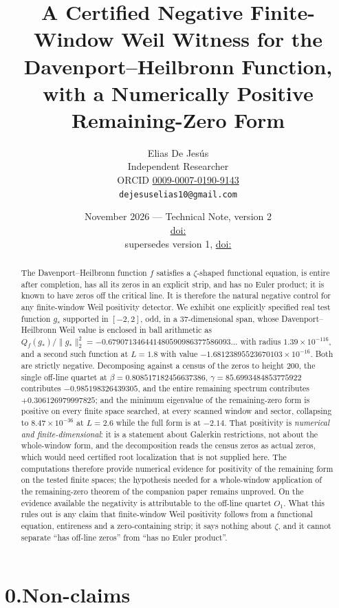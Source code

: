 \documentclass[11pt,a4paper]{article}
\title{\bfseries A Certified Negative Finite-Window Weil Witness for the
Davenport--Heilbronn Function, with a Numerically Positive Remaining-Zero Form}
\author{Elias De Jes\'us\\[2pt]
{\small Independent Researcher}\\[1pt]
{\small ORCID \href{https://orcid.org/0009-0007-0190-9143}{0009-0007-0190-9143}}\\[1pt]
{\small \texttt{dejesuselias10@gmail.com}}}
\date{November 2026 --- Technical Note, version 2\\[2pt]
{\small\href{https://doi.org/\thisdoi}{doi:\thisdoi}}\\[1pt]
{\small supersedes version 1, \href{https://doi.org/\priordoi}{doi:\priordoi}}}
\theoremstyle{definition}
\theoremstyle{remark}
\begin{document}
\maketitle

\begin{abstract}
\noindent
The Davenport--Heilbronn function $f$ satisfies a $\zeta$-shaped functional equation, is
entire after completion, has all its zeros in an explicit strip, and has no Euler
product; it is known to have zeros off the critical line. It is therefore the natural
negative control for any finite-window Weil positivity detector. We exhibit one
explicitly specified real test function $g_*$ supported in $[-2,2]$, odd, in a
$37$-dimensional span, whose Davenport--Heilbronn Weil value is enclosed in ball
arithmetic as
$Q_f(g_*)/\|g_*\|_2^2 = -0.679071346441480590986377586093\ldots$ with radius
$1.39\times10^{-116}$, and a second such function at $L=1.8$ with value
$-1.68123895523670103\times10^{-16}$. Both are strictly negative. Decomposing against a
census of the zeros to height $200$, the single off-line quartet at
$\beta = 0.808517182456637386$, $\gamma = 85.6993484853775922$ contributes
$-0.985198326439305$, and the entire remaining spectrum contributes $+0.306126979997825$;
and the minimum eigenvalue of the remaining-zero form is positive on every finite space
searched, at every scanned window and sector, collapsing to $8.47\times10^{-36}$ at
$L=2.6$ while the full form is at $-2.14$. That positivity is \emph{numerical and
finite-dimensional}: it is a statement about Galerkin restrictions, not about the
whole-window form, and the decomposition reads the census zeros as actual zeros, which
would need certified root localization that is not supplied here. The computations
therefore provide numerical evidence for positivity of the remaining form on the tested
finite spaces; the hypothesis needed for a whole-window application of the remaining-zero
theorem of the companion paper remains unproved. On the evidence available the negativity
is attributable to the off-line quartet $O_1$. What this
rules out is any claim that finite-window Weil positivity follows from a functional
equation, entireness and a zero-containing strip; it says nothing about $\zeta$, and it
cannot separate ``has off-line zeros'' from ``has no Euler product''.
\end{abstract}

\section*{0.\quad Non-claims}
\end{document}
